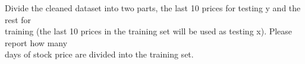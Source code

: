 \documentclass[
]{article}
\newenvironment{Shaded}{\begin{snugshade}}{\end{snugshade}}
\newcommand{\CommentTok}[1]{\textcolor[rgb]{0.56,0.35,0.01}{\textit{#1}}}
\newcommand{\DecValTok}[1]{\textcolor[rgb]{0.00,0.00,0.81}{#1}}
\newcommand{\FunctionTok}[1]{\textcolor[rgb]{0.13,0.29,0.53}{\textbf{#1}}}
\newcommand{\NormalTok}[1]{#1}
\newcommand{\OtherTok}[1]{\textcolor[rgb]{0.56,0.35,0.01}{#1}}
\newcommand{\SpecialCharTok}[1]{\textcolor[rgb]{0.81,0.36,0.00}{\textbf{#1}}}
\begin{document}
\begin{Shaded}
\end{Shaded}

Divide the cleaned dataset into two parts, the last 10 prices for
testing y and the rest for\\
training (the last 10 prices in the training set will be used as testing
x). Please report how many\\
days of stock price are divided into the training set.
\end{document}
